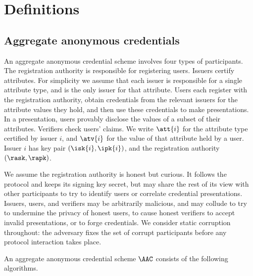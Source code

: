 \section{Definitions}\label{sec:agg-creds-definitions}

\subsection{Aggregate anonymous credentials}

An aggregate anonymous credential scheme involves four types of participants.
The registration authority is responsible for registering users. Issuers certify
attributes. For simplicity we assume that each issuer is responsible for a
single attribute type, and is the only issuer for that attribute. Users each
register with the registration authority, obtain credentials from the relevant
issuers for the attribute values they hold, and then use these credentials to
make presentations. In a presentation, users provably disclose the values of a
subset of their attributes. Verifiers check users' claims. We write $\att{i}$ for
the attribute type certified by issuer $i$, and $\atv{i}$ for the value of that
attribute held by a user. Issuer $i$ has key pair $(\isk{i}, \ipk{i})$, and the
registration authority $(\rask, \rapk)$.

We assume the registration authority is honest but curious. It follows the
protocol and keeps its signing key secret, but may share the rest of its view
with other participants to try to identify users or correlate credential
presentations. Issuers, users, and verifiers may be
arbitrarily malicious, and may collude to try to undermine the privacy of honest
users, to cause honest verifiers to accept invalid presentations, or to forge
credentials.  We consider static corruption throughout: the adversary fixes the
set of corrupt participants before any protocol interaction takes place.

An aggregate anonymous credential scheme $\AAC$ consists of the following
algorithms.

